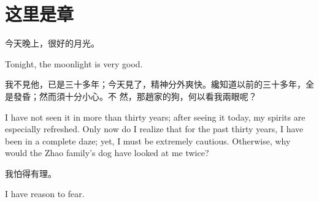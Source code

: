 \chapter{这里是章}

\begin{paracol}{2}[]

今天晚上，很好的月光。

\switchcolumn

Tonight, the moonlight is very good.

\switchcolumn

我不見他，已是三十多年；今天見了，精神分外爽快。纔知道以前的三十多年，全是發昏；然而須十分小心。不
然，那趙家的狗，何以看我兩眼呢？

\switchcolumn

I have not seen it in more than thirty years; after seeing it today, my spirits are especially
refreshed. Only now do I realize that for the past thirty years, I have been in a complete daze;
yet, I must be extremely cautious. Otherwise, why would the Zhao family's dog have looked at me
twice?

\switchcolumn*

我怕得有理。

\switchcolumn

I have reason to fear.

\end{paracol}


